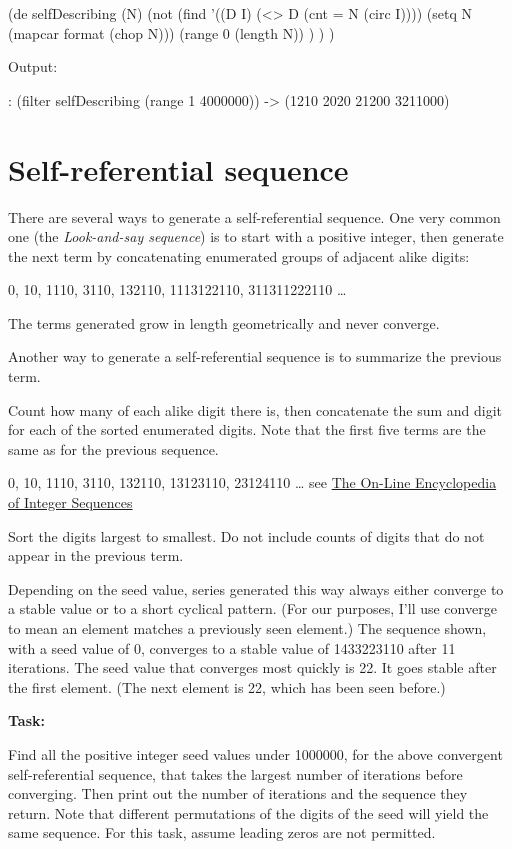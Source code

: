\begin{wideverbatim}

(de selfDescribing (N)
   (not
      (find '((D I) (<> D (cnt = N (circ I))))
         (setq N (mapcar format (chop N)))
         (range 0 (length N)) ) ) )

Output:

: (filter selfDescribing (range 1 4000000))
-> (1210 2020 21200 3211000)

\end{wideverbatim}

\pagebreak{}
\section*{Self-referential sequence}

There are several ways to generate a self-referential sequence. One very
common one (the \emph{Look-and-say
sequence}) is to start with a positive integer, then generate the next
term by concatenating enumerated groups of adjacent alike digits:

0, 10, 1110, 3110, 132110, 1113122110, 311311222110 \ldots{}

The terms generated grow in length geometrically and never converge.

Another way to generate a self-referential sequence is to summarize the
previous term.

Count how many of each alike digit there is, then concatenate the sum
and digit for each of the sorted enumerated digits. Note that the first
five terms are the same as for the previous sequence.

0, 10, 1110, 3110, 132110, 13123110, 23124110 \ldots{} see
\href{http://oeis.org/A036058}{The On-Line Encyclopedia of Integer
Sequences}

Sort the digits largest to smallest. Do not include counts of digits
that do not appear in the previous term.

Depending on the seed value, series generated this way always either
converge to a stable value or to a short cyclical pattern. (For our
purposes, I'll use converge to mean an element matches a previously seen
element.) The sequence shown, with a seed value of 0, converges to a
stable value of 1433223110 after 11 iterations. The seed value that
converges most quickly is 22. It goes stable after the first element.
(The next element is 22, which has been seen before.)

\pagebreak{}
\textbf{Task:}

Find all the positive integer seed values under 1000000, for the above
convergent self-referential sequence, that takes the largest number of
iterations before converging. Then print out the number of iterations
and the sequence they return. Note that different permutations of the
digits of the seed will yield the same sequence. For this task, assume
leading zeros are not permitted.

